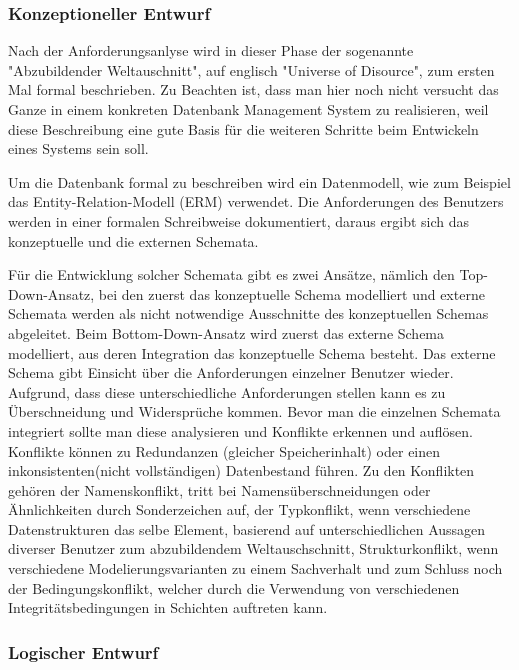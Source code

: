 \begin{flushleft}
\subsubsection{Konzeptioneller Entwurf}

Nach der Anforderungsanlyse wird in dieser Phase der sogenannte "Abzubildender Weltauschnitt", auf englisch "Universe of Disource", zum ersten Mal formal beschrieben. Zu Beachten ist, dass man hier noch nicht versucht das Ganze in einem konkreten Datenbank Management System zu realisieren, weil diese Beschreibung eine gute Basis für die weiteren Schritte beim Entwickeln eines Systems sein soll.

Um die Datenbank formal zu beschreiben wird ein Datenmodell, wie zum Beispiel das Entity-Relation-Modell (ERM) verwendet. Die Anforderungen des Benutzers werden in einer formalen Schreibweise dokumentiert, daraus ergibt sich das konzeptuelle und die externen Schemata.

Für die Entwicklung solcher Schemata gibt es zwei Ansätze, nämlich den Top-Down-Ansatz, bei den zuerst das konzeptuelle Schema modelliert und externe Schemata werden als nicht notwendige Ausschnitte des konzeptuellen Schemas abgeleitet. Beim Bottom-Down-Ansatz wird zuerst das externe Schema modelliert, aus deren Integration das konzeptuelle Schema besteht. Das externe Schema gibt Einsicht über die Anforderungen einzelner Benutzer wieder. Aufgrund, dass diese unterschiedliche Anforderungen stellen kann es zu Überschneidung und Widersprüche kommen. Bevor man die einzelnen Schemata integriert sollte man diese analysieren und Konflikte erkennen und auflösen. Konflikte können zu Redundanzen (gleicher Speicherinhalt) oder einen inkonsistenten(nicht vollständigen) Datenbestand führen. Zu den Konflikten gehören der Namenskonflikt, tritt bei Namensüberschneidungen oder Ähnlichkeiten durch Sonderzeichen auf, der Typkonflikt, wenn verschiedene Datenstrukturen das selbe Element, basierend auf unterschiedlichen Aussagen diverser Benutzer zum abzubildendem Weltauschschnitt, Strukturkonflikt, wenn verschiedene Modelierungsvarianten zu einem Sachverhalt und zum Schluss noch der Bedingungskonflikt, welcher durch die Verwendung von verschiedenen Integritätsbedingungen in Schichten auftreten kann.

\subsubsection{Logischer Entwurf}


\end{flushleft}
